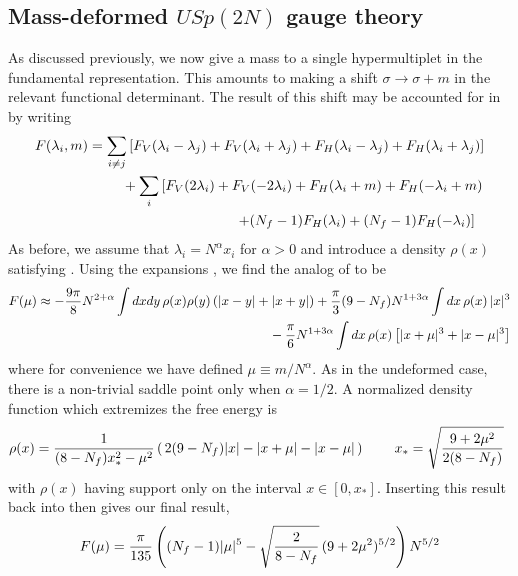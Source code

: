 \documentclass[12pt]{article}
\begin{document}
\subsection{Mass-deformed $USp(2N)$ gauge theory}
As discussed previously, we now give a mass to a single hypermultiplet in the fundamental representation. This amounts to making a shift $\sigma \rightarrow \sigma + m $ in the relevant functional determinant. The result of this shift may be accounted for in  by writing
\begin{eqnarray}
F(\lambda_i,m) = \sum_{i \neq j} \left[F_V(\lambda_i - \lambda_j) + F_V(\lambda_i + \lambda_j) + F_H(\lambda_i - \lambda_j) + F_H(\lambda_i + \lambda_j) \right] 
\nonumber\\
\vphantom{.}\hspace{0.25in}+ \sum_i \left[F_V(2 \lambda_i)+F_V(-2 \lambda_i) +F_H(\lambda_i+m) + F_H(-\lambda_i+m) \right.
\nonumber\\
\vphantom{.}\hspace{1in}\left. + (N_f-1) F_H(\lambda_i) + (N_f-1) F_H(-\lambda_i)  \right]\,\,\,\,
\end{eqnarray}
As before, we assume that $\lambda_i = N^\alpha x_i$ for $\alpha>0$ and introduce a density $\rho(x)$ satisfying . Using the expansions , we find the analog of  to be
\begin{eqnarray}
F(\mu) \approx - {9 \pi \over 8}N^{2 + \alpha} \int dx dy\, \rho(x) \rho(y) \left(|x-y| + |x+y| \right)  + { \pi \over 3} (9-N_f)N^{1 + 3 \alpha} \int dx\, \rho(x) \,|x|^3
\nonumber\\
\vphantom{.} \hspace{0.3 in} - {\pi \over 6} N^{1 + 3 \alpha} \int dx \,\rho(x) \left[ |x + \mu|^3 + |x-\mu|^3 \right]
\end{eqnarray}
where for convenience we have defined $\mu \equiv m/N^\alpha$. As in the undeformed case, there is a non-trivial saddle point only when $\alpha=1/2$.  A normalized density function which extremizes the free energy is
\begin{eqnarray}
\rho(x) = {1 \over (8-N_f) x_*^2 - \mu^2}\left(\,2(9-N_f) |x| - |x+ \mu| - |x-\mu|\, \right) \hspace{0.3 in} x_* = \sqrt{9 + 2 \mu^2 \over 2(8-N_f)}\,\,\,
\end{eqnarray}
with $\rho(x)$ having support only on the interval $x \in [0,x_*]$. Inserting this result back into  then gives our final result,
\begin{eqnarray}
F(\mu) = {\pi \over 135}  \left( (N_f-1) |\mu|^5-\sqrt{2\over 8-N_f}\,(9+2 \mu^2)^{5/2} \right)N^{5/2}
\end{eqnarray}
\end{document}
